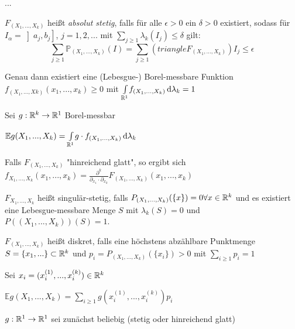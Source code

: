 \documentclass{cheat-sheet}
\renewcommand{\P}{\mathbb{P}} %
\newcommand{\E}{\mathbb{E}} %
\begin{document}














...


$F_(X_1, ..., X_k)$ heißt \emph{absolut stetig}, falls für alle $\epsilon > 0$ ein $\delta > 0$ existiert, sodass für $I_{\alpha} = \left] a_j, b_j \right]$, $j = 1, 2, ...$ mit $\sum_{j \geq 1} \lambda_k(I_j) \leq \delta$ gilt:
\[ \sum_{j \geq 1} \P_{(X_1, ..., X_k)}(I) = \sum_{j \geq 1} (triangle F_{(X_1, ..., X_k)}) I_j \leq \epsilon \]

Genau dann existiert eine (Lebesgue-) Borel-messbare Funktion $f_{(X_1, ..., Xk)}(x_1, ..., x_k) \geq 0$ mit ${\textstyle \int\limits_{\mathbb{R}^1}^{}} f_{(X_1, ..., X_k)} \,\mathrm{d} \lambda_k = 1$

Sei $g : \mathbb{R}^k \to \mathbb{R}^1$ Borel-messbar

$\E g(X_1, ..., X_k) = \Int{\R^1}{}{g \cdot f_{(X_1, ..., X_k)}}{\lambda_k}$
 
Falls $F_{(X_1, ..., X_k)}$ "hinreichend glatt", so ergibt sich
$f_{X_1, ..., X_k}(x_1, ..., x_k) = \frac{\partial^k}{\partial_{x_1} \cdot \partial_{x_k}} F_{(X_1, ..., X_k)}(x_1, ..., x_k)$

$F_{X_1, ..., X_k}$ heißt singulär-stetig, falls $P_{(X_1, ..., X_k)}(\{ x \}) = 0 \forall x \in \mathbb{R}^k$
und es existiert eine Lebesgue-messbare Menge $S$ mit $\lambda_k(S) = 0$ und $P((X_1, ..., X_k))(S) = 1$.

$F_{(X_1, ..., X_k)}$ heißt diskret, falls eine höchstens abzählbare Punktmenge $S = \{ x_1, ... \} \subset \mathbb{R}^k$ und $p_i = P_{(X_1, ..., X_k)}(\{ x_i \}) > 0$ mit $\sum_{i \geq 1} p_i = 1$

Sei $x_i = (x_i^{(1)}, ..., x_i^{(k)}) \in \mathbb{R}^k$

$\E g(X_1, ..., X_k) = \sum_{i \geq 1} g(x_i^{(1)}, ..., x_i^{(k)}) p_i$


$g : \mathbb{R}^1 \to \mathbb{R}^1$ sei zunächst beliebig (stetig oder hinreichend glatt)
\end{document}
